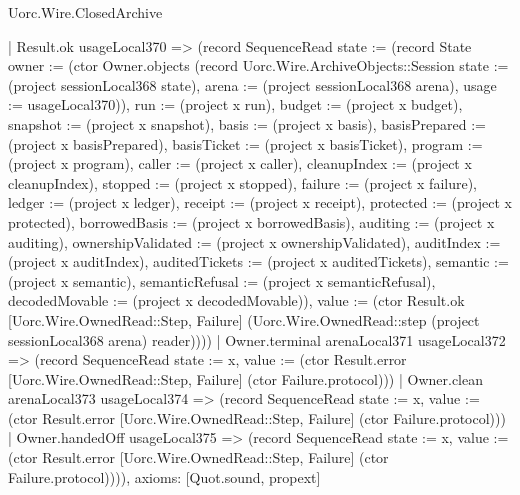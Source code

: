 \begin{lexlean}{Uorc.Wire.ClosedArchive}
\begin{semanticmodule}
{      | Result.ok usageLocal370 => (record SequenceRead {state := (record State {owner := (ctor Owner.objects (record Uorc.Wire.ArchiveObjects::Session {state := (project sessionLocal368 state), arena := (project sessionLocal368 arena), usage := usageLocal370})), run := (project x run), budget := (project x budget), snapshot := (project x snapshot), basis := (project x basis), basisPrepared := (project x basisPrepared), basisTicket := (project x basisTicket), program := (project x program), caller := (project x caller), cleanupIndex := (project x cleanupIndex), stopped := (project x stopped), failure := (project x failure), ledger := (project x ledger), receipt := (project x receipt), protected := (project x protected), borrowedBasis := (project x borrowedBasis), auditing := (project x auditing), ownershipValidated := (project x ownershipValidated), auditIndex := (project x auditIndex), auditedTickets := (project x auditedTickets), semantic := (project x semantic), semanticRefusal := (project x semanticRefusal), decodedMovable := (project x decodedMovable)}), value := (ctor Result.ok [Uorc.Wire.OwnedRead::Step, Failure] (Uorc.Wire.OwnedRead::step (project sessionLocal368 arena) reader))}))
    | Owner.terminal arenaLocal371 usageLocal372 => (record SequenceRead {state := x, value := (ctor Result.error [Uorc.Wire.OwnedRead::Step, Failure] (ctor Failure.protocol))})
    | Owner.clean arenaLocal373 usageLocal374 => (record SequenceRead {state := x, value := (ctor Result.error [Uorc.Wire.OwnedRead::Step, Failure] (ctor Failure.protocol))})
    | Owner.handedOff usageLocal375 => (record SequenceRead {state := x, value := (ctor Result.error [Uorc.Wire.OwnedRead::Step, Failure] (ctor Failure.protocol))})),
  axioms: [Quot.sound, propext]
}


\end{semanticmodule}
\end{lexlean}
